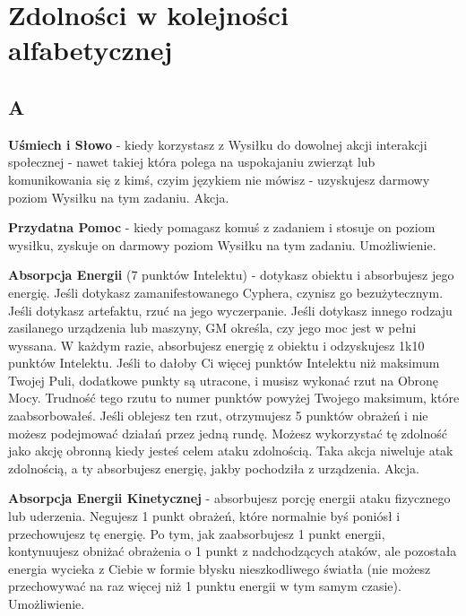 
\chapter{Zdolności w kolejności alfabetycznej}

\section{A}

\textbf{Uśmiech i Słowo}\label{sec:Uśmiech i Słowo} - kiedy korzystasz z Wysiłku do dowolnej akcji interakcji społecznej - nawet takiej która polega na uspokajaniu zwierząt lub komunikowania się z kimś, czyim językiem nie mówisz - uzyskujesz darmowy poziom Wysiłku na tym zadaniu. Akcja.

\textbf{Przydatna Pomoc}\label{sec:Przydatna Pomoc} - kiedy pomagasz komuś z zadaniem i stosuje on poziom wysiłku, zyskuje on darmowy poziom Wysiłku na tym zadaniu. Umożliwienie. 

\textbf{Absorpcja Energii}\label{sec:Absorpcja Energii} (7 punktów Intelektu) - dotykasz obiektu i absorbujesz jego energię. Jeśli dotykasz zamanifestowanego Cyphera, czynisz go bezużytecznym. Jeśli dotykasz artefaktu, rzuć na jego wyczerpanie. Jeśli dotykasz innego rodzaju zasilanego urządzenia lub maszyny, GM określa, czy jego moc jest w pełni wyssana. W każdym razie, absorbujesz energię z obiektu i odzyskujesz 1k10 punktów Intelektu. Jeśli to dałoby Ci więcej punktów Intelektu niż maksimum Twojej Puli, dodatkowe punkty są utracone, i musisz wykonać rzut na Obronę Mocy. Trudność tego rzutu to numer punktów powyżej Twojego maksimum, które zaabsorbowałeś. Jeśli oblejesz ten rzut, otrzymujesz 5 punktów obrażeń i nie możesz podejmować działań przez jedną rundę. Możesz wykorzystać tę zdolność jako akcję obronną kiedy jesteś celem ataku zdolnością. Taka akcja niweluje atak zdolnością, a ty absorbujesz energię, jakby pochodziła z urządzenia. Akcja.

\textbf{Absorpcja Energii Kinetycznej}\label{sec:Absorpcja Energii Kinetycznej} - absorbujesz porcję energii ataku fizycznego lub uderzenia. Negujesz 1 punkt obrażeń, które normalnie byś poniósł i przechowujesz tę energię. Po tym, jak zaabsorbujesz 1 punkt energii, kontynuujesz obniżać obrażenia o 1 punkt z nadchodzących ataków, ale pozostała energia wycieka z Ciebie w formie błysku nieszkodliwego światła (nie możesz przechowywać na raz więcej niż 1 punktu energii w tym samym czasie). Umożliwienie. 


